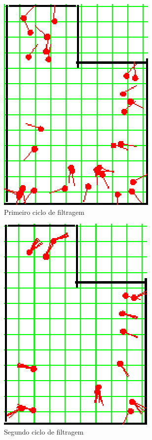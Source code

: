 \begin{figure}[H]
  \centering
  \includegraphics[scale=1]{figuras/cen3_ex3/2.eps}
  \caption[Primeiro Ciclo de Filtragem]{Primeiro ciclo de filtragem}
  \label{img:cen3_ex3_2}
\end{figure}

\begin{figure}[H]
  \centering
  \includegraphics[scale=1]{figuras/cen3_ex3/3.eps}
  \caption[Segundo Ciclo de Filtragem]{Segundo ciclo de filtragem}
  \label{img:cen3_ex3_3}
\end{figure}

